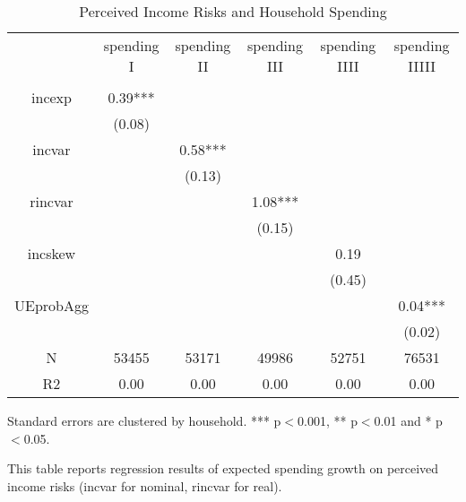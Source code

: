 \begin{table}[p]
\centering
\begin{adjustbox}{width={0.9\textwidth}}
\begin{threeparttable}
\caption{Perceived Income Risks and Household Spending}
\label{spending_reg}\begin{tabular}{cccccc}
\toprule
{} & spending I & spending II & spending III & spending IIII & spending IIIII \\
          &            &             &              &               &                \\
\midrule
incexp    &    0.39*** &             &              &               &                \\
          &     (0.08) &             &              &               &                \\
incvar    &            &     0.58*** &              &               &                \\
          &            &      (0.13) &              &               &                \\
rincvar   &            &             &      1.08*** &               &                \\
          &            &             &       (0.15) &               &                \\
incskew   &            &             &              &          0.19 &                \\
          &            &             &              &        (0.45) &                \\
UEprobAgg &            &             &              &               &        0.04*** \\
          &            &             &              &               &         (0.02) \\
N         &      53455 &       53171 &        49986 &         52751 &          76531 \\
R2        &       0.00 &        0.00 &         0.00 &          0.00 &           0.00 \\
\bottomrule
\end{tabular}
\begin{tablenotes}\item Standard errors are clustered by household. *** p$<$0.001, ** p$<$0.01 and * p$<$0.05. 
\item This table reports regression results of expected spending growth on perceived income risks (incvar for nominal, rincvar for real).
\end{tablenotes}
\end{threeparttable}
\end{adjustbox}
\end{table}